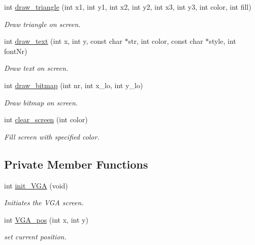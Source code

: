 \begin{DoxyCompactItemize}
int \mbox{\hyperlink{class_vgascreen_ae7d7e2b13c8aee3181ebe96d1547663f}{draw\+\_\+triangle}} (int x1, int y1, int x2, int y2, int x3, int y3, int color, int fill)
\begin{DoxyCompactList}\small\item\em Draw triangle on screen. \end{DoxyCompactList}\item 
int \mbox{\hyperlink{class_vgascreen_a711cdaf1b83fafcea034f2c4a54ad872}{draw\+\_\+text}} (int x, int y, const char $\ast$str, int color, const char $\ast$style, int font\+Nr)
\begin{DoxyCompactList}\small\item\em Draw text on screen. \end{DoxyCompactList}\item 
int \mbox{\hyperlink{class_vgascreen_ad523b2dd47a6f2adde2d40cf1d809f27}{draw\+\_\+bitmap}} (int nr, int x\+\_\+lo, int y\+\_\+lo)
\begin{DoxyCompactList}\small\item\em Draw bitmap on screen. \end{DoxyCompactList}\item 
int \mbox{\hyperlink{class_vgascreen_a5420000fe45606af438d6de37cb59fa4}{clear\+\_\+screen}} (int color)
\begin{DoxyCompactList}\small\item\em Fill screen with specified color. \end{DoxyCompactList}\end{DoxyCompactItemize}
\subsection*{Private Member Functions}
\begin{DoxyCompactItemize}
\item 
int \mbox{\hyperlink{class_vgascreen_a8240f97328e1e32fdec08a113c927e4f}{init\+\_\+\+V\+GA}} (void)
\begin{DoxyCompactList}\small\item\em Initiates the V\+GA screen. \end{DoxyCompactList}\item 
int \mbox{\hyperlink{class_vgascreen_a4e52b131d405cf11ad6aed9b993ed138}{V\+G\+A\+\_\+pos}} (int x, int y)
\begin{DoxyCompactList}\small\item\em set current position. \end{DoxyCompactList}\end{DoxyCompactItemize}
